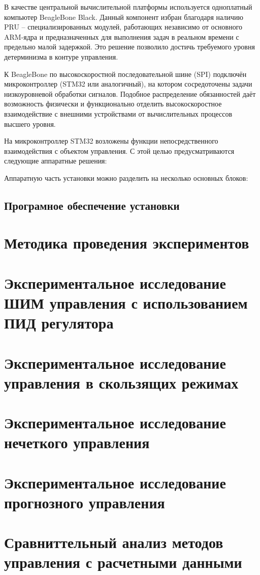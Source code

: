 В качестве центральной вычислительной платформы используется одноплатный компьютер BeagleBone Black.
Данный компонент избран благодаря наличию PRU -- специализированных модулей, работающих независимо от основного
ARM-ядра и предназначенных для выполнения задач в реальном времени с предельно
малой задержкой. Это решение позволило достичь требуемого уровня детерминизма в контуре управления.

К BeagleBone по высокоскоростной последовательной шине (SPI) подключён
микроконтроллер (STM32 или аналогичный), на котором сосредоточены
задачи низкоуровневой обработки сигналов. Подобное распределение обязанностей
даёт возможность физически и функционально отделить высокоскоростное взаимодействие
с внешними устройствами от вычислительных процессов высшего уровня.

На микроконтроллер STM32 возложены функции непосредственного взаимодействия с объектом управления.
С этой целью предусматриваются следующие аппаратные решения:


Аппаратную часть установки можно разделить на несколько основных блоков:

\subsection{Програмное обеспечение установки}\label{sec:ch5/sec1/subsec2}

\section{Методика проведения экспериментов}\label{sec:ch5/sec2}

\section{Экспериментальное исследование ШИМ управления с использованием ПИД регулятора}\label{sec:ch5/sec3}
\section{Экспериментальное исследование управления в скользящих режимах}\label{sec:ch5/sec4}
\section{Экспериментальное исследование нечеткого управления}\label{sec:ch5/sec5}
\section{Экспериментальное исследование прогнозного управления}\label{sec:ch5/sec6}
\section{Сравниттельный анализ методов управления с расчетными данными}\label{sec:ch5/sec7}
